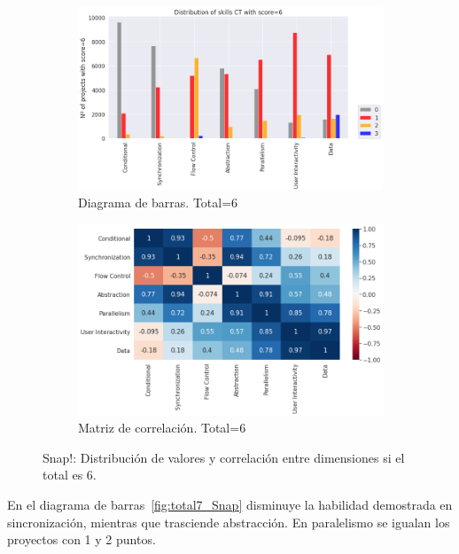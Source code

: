 \documentclass[a4paper, 12pt]{book}
\begin{document}
\begin{figure}[H]
    \centering
    \begin{subfigure}[h]{.49\textwidth} 
        \includegraphics[width=\textwidth]{img/distribucion_6_Snap}
        \caption{Diagrama de barras. Total=6}
        \label{fig:total6_Snap}
    \end{subfigure}       
    \begin{subfigure}[h]{.49\textwidth} 
        \includegraphics[width=\textwidth]{img/corr_6_Snap}
        \caption{Matriz de correlación. Total=6}
        \label{fig:corr6_Snap}
    \end{subfigure}
    \caption{Snap!: Distribución de valores y correlación entre dimensiones si el total es 6.}
\end{figure}

En el diagrama de barras~\ref{fig:total7_Snap} disminuye la habilidad demostrada en sincronización, mientras que trasciende abstracción. En paralelismo se igualan los proyectos con 1 y 2 puntos.
\end{document}
